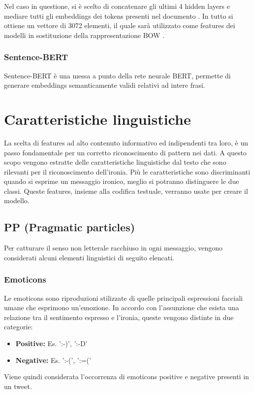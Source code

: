 \documentclass[oneside]{book}
\begin{document}
\noindent
Nel caso in questione, si è scelto di concatenare gli ultimi 4 hidden layers e mediare tutti gli embeddings dei tokens presenti nel documento \cite{bibid}. In tutto si ottiene un vettore di 3072 elementi, il quale sarà utilizzato come features dei modelli in sostituzione della rappresentazione BOW \cite{berttutorial}.

\subsubsection{Sentence-BERT}
Sentence-BERT\cite{sentencebert} è una messa a punto della rete neurale BERT, permette di generare embeddings semanticamente validi relativi ad intere frasi.

\section{Caratteristiche linguistiche}
La scelta di features ad alto contenuto informativo ed indipendenti tra loro, è un passo fondamentale per un corretto riconoscimento di pattern nei dati.
A questo scopo vengono estratte delle caratteristiche linguistiche dal testo che sono rilevanti per il riconoscimento dell'ironia. Più le caratteristiche sono discriminanti quando si esprime un messaggio ironico, meglio si potranno distinguere le due classi. Queste features, insieme alla codifica testuale, verranno usate per creare il modello.

\subsection{PP (Pragmatic particles)}
Per catturare il senso non letterale racchiuso in ogni messaggio, vengono considerati alcuni elementi linguistici di seguito elencati.

\subsubsection{Emoticons}
Le emoticons sono riproduzioni stilizzate di quelle principali espressioni facciali umane che esprimono un'emozione. In accordo con l'assunzione che esista una relazione tra il sentimento espresso e l'ironia, queste vengono distinte in due categorie:
\begin{itemize}
	\item
	\textbf{Positive: } Es. ':-)', ':-D'
	\item
	\textbf{Negative: } Es. ':-(', ':=('
\end{itemize}
Viene quindi considerata l'occorrenza di emoticons positive e negative presenti in un tweet.
\end{document}
